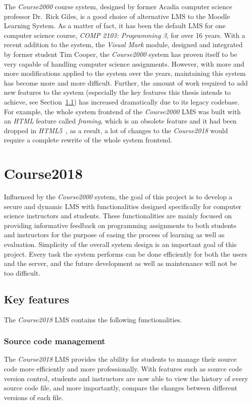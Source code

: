 The \emph{Course2000} course system, designed by former Acadia computer science
professor Dr.~Rick Giles, is a good choice
of alternative LMS to the Moodle Learning System.
As a matter of fact, it has been the
default LMS for one computer science course, \emph{COMP 2103: Programming 3},
for over 16 years.
With a recent addition to the system,
the \emph{Visual Mark} module,
designed and integrated by former student Tim Cooper,
the \emph{Course2000} system has proven itself
to be very capable of handling computer science assignments.
However, with more
and more modifications applied to the system over the years, maintaining
this system has become more and more difficult.
Further, the amount of work required to add new features to the
system (especially the key features this thesis intends to achieve,
see Section~\ref{FEATURES}) has increased dramatically
due to its legacy codebase.
For example, the whole system frontend of the \emph{Course2000} LMS was built
with an \emph{HTML} feature called \emph{framing}, which is an obsolete feature
and it had been dropped in \emph{HTML5}~\cite{framing}, 
as a result, a lot of changes to the \emph{Course2018} would require a complete
rewrite of the whole system frontend.

\section{Course2018}
Influenced by the \emph{Course2000} system, the goal of this project is to
develop a secure and dynamic LMS with functionalities designed specifically for
computer science instructors and students.
These functionalities are mainly focused on
providing informative feedback on programming assignments to both students
and instructors for the purpose of easing the process of learning as well as
evaluation.
Simplicity of the overall system design is an important goal of this project.
Every task the system 
performs can be done efficiently for both the users and the server,
and the future development as well as maintenance will not be too difficult.

\subsection{Key features}
\label{FEATURES}
The \emph{Course2018} LMS contains the following functionalities.

\subsubsection{Source code management}
The \emph{Course2018} LMS provides the ability for students to manage
their source code more efficiently and more professionally. With features such
as source code version control, students and instructors are now able
to view the history of every source code file, and more importantly, compare
the changes between different versions of each file.

